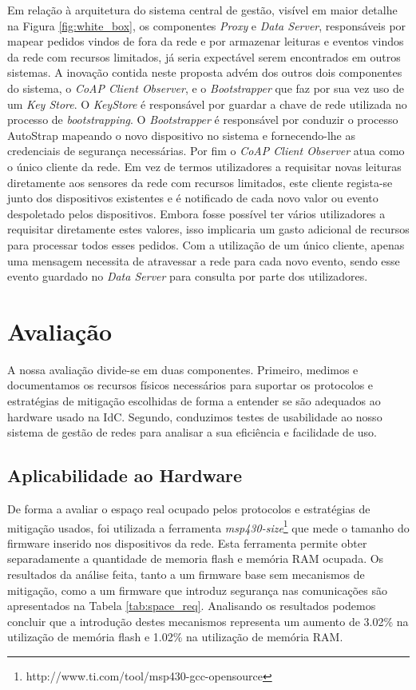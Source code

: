 \documentclass{llncs}
\begin{document}
Em relação à arquitetura do sistema central de gestão, visível em maior detalhe na Figura \ref{fig:white_box}, os componentes \textit{Proxy} e \textit{Data Server}, responsáveis por mapear pedidos vindos de fora da rede e por armazenar leituras e eventos vindos da rede com recursos limitados, já seria expectável serem encontrados em outros sistemas. A inovação contida neste proposta advém dos outros dois componentes do sistema, o \textit{CoAP Client Observer}, e o \textit{Bootstrapper} que faz por sua vez uso de um \textit{Key Store}. O \textit{KeyStore} é responsável por guardar a chave de rede utilizada no processo de \textit{bootstrapping}. O \textit{Bootstrapper} é responsável por conduzir o processo AutoStrap mapeando o novo dispositivo no sistema e fornecendo-lhe as credenciais de segurança necessárias. Por fim o \textit{CoAP Client Observer} atua como o único cliente da rede. Em vez de termos utilizadores a requisitar novas leituras diretamente aos sensores da rede com recursos limitados, este cliente regista-se junto dos dispositivos existentes e é notificado de cada novo valor ou evento despoletado pelos dispositivos. Embora fosse possível ter vários utilizadores a requisitar diretamente estes valores, isso implicaria um gasto adicional de recursos para processar todos esses pedidos. Com a utilização de um único cliente, apenas uma mensagem necessita de atravessar a rede para cada novo evento, sendo esse evento guardado no \textit{Data Server} para consulta por parte dos utilizadores.

\section{Avaliação}
\label{sec:evaluation}
A nossa avaliação divide-se em duas componentes. Primeiro, medimos e documentamos os recursos físicos necessários para suportar os protocolos e estratégias de mitigação escolhidas de forma a entender se são adequados ao hardware usado na \ac{IdC}. Segundo, conduzimos testes de usabilidade ao nosso sistema de gestão de redes para analisar a sua eficiência e facilidade de uso.

\subsection{Aplicabilidade ao Hardware}
De forma a avaliar o espaço real ocupado pelos protocolos e estratégias de mitigação usados, foi utilizada a ferramenta \textit{msp430-size}\footnote{http://www.ti.com/tool/msp430-gcc-opensource} que mede o tamanho do firmware inserido nos dispositivos da rede. Esta ferramenta permite obter separadamente a quantidade de memoria flash e memória \ac{RAM} ocupada. Os resultados da análise feita, tanto a um firmware base sem mecanismos de mitigação, como a um firmware que introduz segurança nas comunicações são apresentados na Tabela \ref{tab:space_req}. Analisando os resultados podemos concluir que a introdução destes mecanismos representa um aumento de 3.02\% na utilização de memória flash e 1.02\% na utilização de memória \ac{RAM}.
\end{document}
